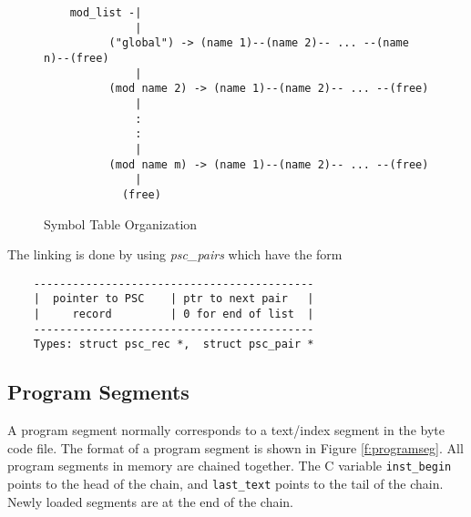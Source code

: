 \documentclass[11pt]{article}
\begin{document}
\begin{figure}
\begin{verbatim}
    mod_list -|
              |
          ("global") -> (name 1)--(name 2)-- ... --(name n)--(free)
              |
          (mod name 2) -> (name 1)--(name 2)-- ... --(free)
              |
              :
              :
              |
          (mod name m) -> (name 1)--(name 2)-- ... --(free)
              |
            (free)
\end{verbatim}
\caption{Symbol Table Organization}
\label{f:pscinmem}
\end{figure}

The linking is done by using {\it psc\_pairs} which have the form

\begin{verbatim}
    -------------------------------------------
    |  pointer to PSC    | ptr to next pair   |
    |     record         | 0 for end of list  |
    -------------------------------------------
    Types: struct psc_rec *,  struct psc_pair *
\end{verbatim}


\subsection{Program Segments}

A program segment normally corresponds to a text/index segment in the 
byte code file.
The format of a program segment is shown in Figure \ref{f:programseg}.
All program segments in memory are chained together. The C variable
{\tt inst\_begin} points to the head of the chain, and 
{\tt last\_text} points to the tail of the chain. Newly loaded
segments are at the end of the chain.
\end{document}
